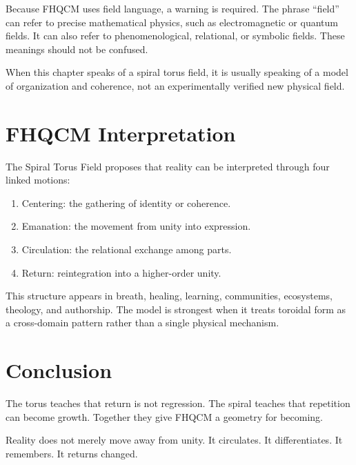 Because FHQCM uses field language, a warning is required. The phrase ``field'' can refer to precise mathematical physics, such as electromagnetic or quantum fields. It can also refer to phenomenological, relational, or symbolic fields. These meanings should not be confused.

When this chapter speaks of a spiral torus field, it is usually speaking of a model of organization and coherence, not an experimentally verified new physical field.

\section{FHQCM Interpretation}

The Spiral Torus Field proposes that reality can be interpreted through four linked motions:

\begin{enumerate}
\item Centering: the gathering of identity or coherence.
\item Emanation: the movement from unity into expression.
\item Circulation: the relational exchange among parts.
\item Return: reintegration into a higher-order unity.
\end{enumerate}

This structure appears in breath, healing, learning, communities, ecosystems, theology, and authorship. The model is strongest when it treats toroidal form as a cross-domain pattern rather than a single physical mechanism.

\section{Conclusion}

The torus teaches that return is not regression. The spiral teaches that repetition can become growth. Together they give FHQCM a geometry for becoming.

Reality does not merely move away from unity. It circulates. It differentiates. It remembers. It returns changed.

